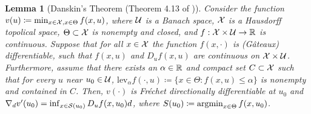 \documentclass{article}
\newtheorem{lemma}{Lemma}
\begin{document}
\begin{appendices}
\begin{lemma}[Danskin's Theorem (Theorem 4.13 of \cite{bonnans2000perturbation})]\label{lem:danskin}
    Consider the function $v(u) \coloneqq \min_{x \in \mathcal{X}, x \in \Theta} f(x, u)$, where $\mathcal{U}$ is a Banach space, $\mathcal{X}$ is a Hausdorff topolical space, $\Theta \subset \mathcal{X}$ is nonempty and closed, and $f: \mathcal{X} \times \mathcal{U} \rightarrow \mathbb{R}$ is continuous. Suppose that for all $x \in \mathcal{X}$ the function $f(x, \cdot)$ is (Gâteaux) differentiable, such that $f(x,u)$ and $D_u f(x,u)$ are continuous on $\mathcal{X} \times \mathcal{U}$. Furthermore, assume that there exists an $\alpha \in \mathbb{R}$ and compact set $C \subset \mathcal{X}$ such that for every $u$ near $u_0 \in \mathcal{U}$, $\text{lev}_{\alpha}f(\cdot, u) \coloneqq \{x \in \Theta: f(x, u) \leq \alpha\}$ is nonempty and contained in $C$. Then, $v(\cdot)$ is Fréchet directionally differentiable at $u_0$ and $\nabla_{d}v'(u_0) = \inf_{x \in \mathcal{S}(u_0)} D_u f(x, u_0) d$, where $S(u_0) \coloneqq \argmin_{x \in \Theta} f(x, u_0)$.
\end{lemma}


\end{appendices}
\end{document}
